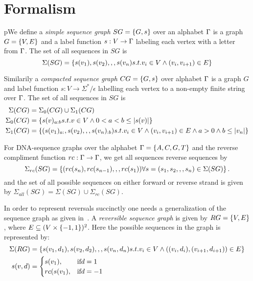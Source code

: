 \section{Formalism}
pWe define a \emph{simple sequence graph} $SG = \left\{G, s\right\}$ over an alphabet $\Gamma$ is a graph $G=\left\{V, E\right\}$ and a label function $s: V \rightarrow \Gamma$ labeling each vertex with a letter from $\Gamma$. The set of all sequences in $SG$ is 
$$\Sigma(SG) = \left\{s(v_1), s(v_2), , , s(v_n) s.t. v_i \in V \wedge (v_i, v_{i+1}) \in E\right\}$$

Similarily a \emph{compacted sequence graph} $CG = \left\{G, s\right\}$ over alphabet $\Gamma$ is a graph $G$ and label function $s: V \rightarrow \Sigma^* / \epsilon$ labelling each vertex to a non-empty finite string over $\Gamma$. The set of all sequences in $SG$ is
\begin{align*}
  \Sigma(CG) &= \Sigma_0(CG) \cup \Sigma_1(CG)\\
  \Sigma_0(CG) &=\left\{s(v)_{a:b} s.t. v \in V \wedge 0<a<b\leq\left|s(v)\right|\right\}\\
  \Sigma_1(CG) &= \left\{(s(v_1)_{a:}, s(v_2),,, s(v_n)_{:b}) s.t. v_i \in V \wedge (v_i, v_{i+1}) \in E \wedge a>0 \wedge b\leq \left|v_n\right|\right\}
\end{align*}

For DNA-sequence graphs over the alphabet $\Gamma=\left\{A, C, G, T\right\}$ and the reverse compliment function $rc: \Gamma \rightarrow \Gamma$, we get all sequences reverse sequences by
$$\Sigma_{rc}(SG) = \left\{(rc(s_n), rc(s_{n-1}), , , rc(s_1)) \forall s=(s_1, s_2,,,s_n) \in \Sigma(SG)\right\}.$$
and the set of all possible sequences on either forward or reverse strand is given by $\Sigma_{all}(SG) = \Sigma(SG) \cup \Sigma_{rc}(SG)$. 

In order to represent reversals succinctly one needs a generalization of the sequence graph as given in~\cite{vg}.
A \emph{reversible sequence graph} is given by $RG = \left\{V, E\right\}$, where $E \subseteq {(V \times \left\{-1, 1\right\})^2}$.
Here the possible sequences in the graph is represented by:
\begin{align*}
  \Sigma(RG) &= \left\{s(v_1, d_1), s(v_2, d_2), , , s(v_n, d_n) s.t. v_i \in V \wedge ((v_i, d_i), (v_{i+1}, d_{i+1})) \in E\right\}\\
  s(v, d) &=\begin{cases} s(v_1), & \text{if} d = 1\\
                        rc(s(v_1), & \text{if} d = -1\\
\end{cases}
\end{align*}
